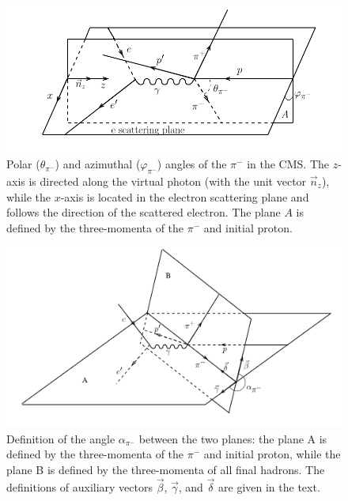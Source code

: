 \begin{figure}[htp]
\begin{center}
\includegraphics[width=14cm]{pictures/cross_section/thetaphi_new.pdf}
\caption{\small Polar ($\theta_{\pi^{-}}$) and azimuthal ($\varphi_{\pi^{-}}$) angles of the $\pi^{-}$ in the CMS. The $z$-axis is directed along the virtual photon (with the unit vector $\vec n_{z}$), while the $x$-axis is located in the electron scattering plane and follows the direction of the scattered electron. The plane $A$ is defined by the three-momenta of the $\pi^{-}$ and initial proton. } \label{fig:cr_sec_thetaphi}
\end{center}
\end{figure}
\begin{figure}[htp]
\begin{center}
\includegraphics[width=14cm]{pictures/cross_section/alpha1.pdf}
\caption{\small Definition of the angle $\alpha_{\pi^{-}}$ between the two planes: the plane A is defined by  the three-momenta of the $\pi^{-}$ and initial proton, while the plane B is defined by the three-momenta of all final hadrons. The definitions of  auxiliary vectors $\vec \beta$, $\vec \gamma$, and $\vec \delta$ are given in the text.} \label{fig:cr_sec_kinematic2}
\end{center}
\end{figure}





